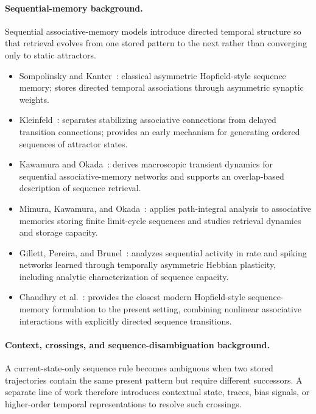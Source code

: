 \documentclass[11pt]{article}
\begin{document}
\paragraph{Sequential-memory background.}
Sequential associative-memory models introduce directed temporal structure so that retrieval evolves from one stored pattern to the next rather than converging only to static attractors.

\begin{itemize}
\item Sompolinsky and Kanter~\cite{sompolinsky1986temporal}: classical asymmetric Hopfield-style sequence memory; stores directed temporal associations through asymmetric synaptic weights.

\item Kleinfeld~\cite{kleinfeld1986sequential}: separates stabilizing associative connections from delayed transition connections; provides an early mechanism for generating ordered sequences of attractor states.
\item Kawamura and Okada~\cite{kawamura2002transient}: derives macroscopic transient dynamics for sequential associative-memory networks and supports an overlap-based description of sequence retrieval.
\item Mimura, Kawamura, and Okada~\cite{mimura2004path}: applies path-integral analysis to associative memories storing finite limit-cycle sequences and studies retrieval dynamics and storage capacity.
\item Gillett, Pereira, and Brunel~\cite{gillett2020tah}: analyzes sequential activity in rate and spiking networks learned through temporally asymmetric Hebbian plasticity, including analytic characterization of sequence capacity.
\item Chaudhry et al.~\cite{chaudhry2024long}: provides the closest modern Hopfield-style sequence-memory formulation to the present setting, combining nonlinear associative interactions with explicitly directed sequence transitions.

\end{itemize}

\paragraph{Context, crossings, and sequence-disambiguation background.}
A current-state-only sequence rule becomes ambiguous when two stored trajectories contain the same present pattern but require different successors.  A separate line of work therefore introduces contextual state, traces, bias signals, or higher-order temporal representations to resolve such crossings.
\end{document}
